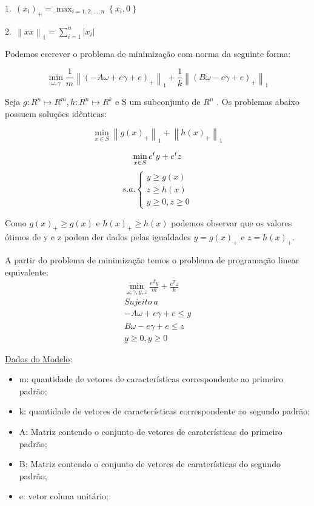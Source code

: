 $1.\ \ (x_{i})_{+} = \max_{i=1,2,...,n}{\left \{x_{i},0  \right \}}$

$2.\ \ \left \| xx \right \|_{1} = \sum_{i=1}^{n}\left | x_{i} \right |$

Podemos escrever o problema de minimização com norma da seguinte forma:

$$\min_{\omega ,\gamma }\frac{1}{m}\left \| \left ( -A\omega + e\gamma  + e \right )_{+} \right \|_{1} + \frac{1}{k}\left \| \left ( B\omega - e\gamma + e  \right )_{+} \right \|_{1}$$

Seja $g:R^{n} \mapsto R^{m} , h:R^{n} \mapsto R^{k}$ e S um subconjunto de $R^{n}$ . Os problemas abaixo possuem soluções idênticas:

$$\min_{x\in S}\left \| g(x)_{+} \right \|_{1} + \left \| h(x)_{+} \right \|_{1}$$


$$\min_{x\in S} e^{t}y + e^{t}z\\$$
$$ s.a.\left\{\begin{matrix}y\geq g(x)\\ z\geq h(x)\\ y\geq 0, z\geq0\end{matrix}\right.$$

Como $g(x)_{+}\geq g(x)$ e $h(x)_{+}\geq h(x)$ podemos observar que os valores ótimos de y e z podem der dados pelas igualdades $y=g(x)_{+}$ e $z=h(x)_{+}$.

A partir do problema de minimização temos o problema de programação linear equivalente:
\begin{eqnarray}
\min_{\omega ,\gamma ,y,z}\frac{e^{T}y}{m}+\frac{e^{T}z}{k} \label{eq3:obj1}\\
Sujeito\ a \nonumber\\
-A\omega +e\gamma+e\leq y\label{eq3:rest1}\\
B\omega -e\gamma+e\leq  z \label{eq3:rest2}\\ 
y\geq 0,y\geq 0 \label{eq3:rest3}
\end{eqnarray}

\underline{Dados do Modelo}:
\begin{itemize}
\item{m}: quantidade de vetores de características correspondente ao primeiro padrão;
\item{k}: quantidade de vetores de características correspondente ao segundo padrão;
\item{A}: Matriz contendo o conjunto de vetores de caraterísticas do primeiro padrão;
\item{B}: Matriz contendo o conjunto de vetores de caraterísticas do segundo padrão;
\item{e}: vetor coluna unitário;
\end{itemize}

